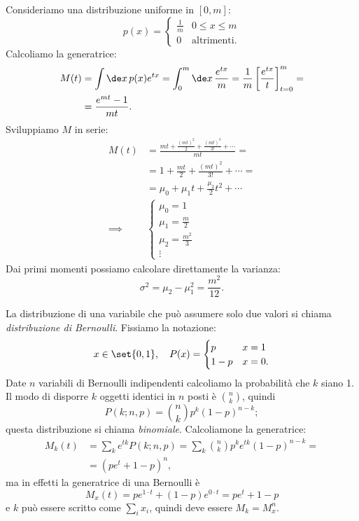 \begin{es}
	Consideriamo una distribuzione uniforme in $[0,m]$:
	\begin{equation*}
		p(x) = \begin{cases}
			\frac 1m & 0 \le x \le m \\
			0  & \text{altrimenti.}
		\end{cases}
	\end{equation*}
	Calcoliamo la generatrice:
	\begin{align*}
		M(t) &= 
		\int \de x\, p(x) e^{tx} =
		\int_0^m \de x\, \frac{e^{tx}}{m} =
		\frac 1m \left[ \frac{e^{tx}}{t} \right]_{t=0}^m = \\
		&= \frac{e^{mt} - 1}{mt}.
	\end{align*}
	Sviluppiamo $M$ in serie:
	\begin{align*}
		M(t) &=
		\frac{mt + \frac{(mt)^2}2 + \frac{(mt)^3}{3!} + \dotsb}{mt} = \\
		&= 1 + \frac{mt}2 + \frac{(mt)^2}{3!} + \dotsb = \\
		&= \mu_0 + \mu_1t + \frac{\mu_2}2t^2 + \dotsb  \\
		\implies &\begin{cases}
			\mu_0 = 1 \\
			\mu_1 = \frac m2 \\
			\mu_2 = \frac{m^2}3 \\
			\vdots
		\end{cases}
	\end{align*}
	Dai primi momenti possiamo calcolare direttamente la varianza:
	\begin{equation*}
		\sigma^2 = \mu_2 - \mu_1^2 = \frac{m^2}{12}.
	\end{equation*}
\end{es}

La distribuzione di una variabile che può assumere solo due valori si chiama \emph{distribuzione di Bernoulli}.
Fissiamo la notazione:
\begin{equation*}
	x \in \set{0,1}, \quad P(x) = \begin{cases}
		p & x = 1 \\
		1-p & x = 0.
	\end{cases}
\end{equation*}
Date $n$ variabili di Bernoulli indipendenti calcoliamo la probabilità che $k$ siano 1.
Il modo di disporre $k$ oggetti identici in $n$ posti è $\binom nk$, quindi
\begin{equation*}
	P(k;n,p) = \binom nk p^{k} (1-p)^{n-k};
\end{equation*}
questa distribuzione si chiama \emph{binomiale}.
Calcoliamone la generatrice:
\begin{align*}
	M_k(t) &=
	\sum_k e^{tk} P(k;n,p) =
	\sum_k \binom nk p^k e^{tk} (1-p)^{n-k} = \\
	&= (pe^t + 1-p)^n,
\end{align*}
ma in effetti la generatrice di una Bernoulli è
\begin{equation*}
	M_x(t) = pe^{1\cdot t} + (1-p)e^{0\cdot t} = pe^t + 1-p
\end{equation*}
e $k$ può essere scritto come $\sum_ix_i$, quindi deve essere $M_k = M_x^n$.


